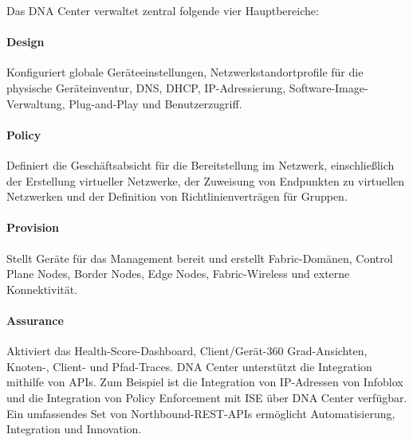 Das DNA Center verwaltet zentral folgende vier Hauptbereiche: \cite{sda-designguide}
\paragraph{Design}
Konfiguriert globale Geräteeinstellungen, Netzwerkstandortprofile für die physische Geräteinventur, DNS, DHCP, IP-Adressierung, Software-Image-Verwaltung, Plug-and-Play und Benutzerzugriff.
\paragraph{Policy}
Definiert die Geschäftsabsicht für die Bereitstellung im Netzwerk, einschließlich der Erstellung virtueller Netzwerke, der Zuweisung von Endpunkten zu virtuellen Netzwerken und der Definition von Richtlinienverträgen für Gruppen.
\paragraph{Provision}
Stellt Geräte für das Management bereit und erstellt Fabric-Domänen, Control Plane Nodes, Border Nodes, Edge Nodes, Fabric-Wireless und externe Konnektivität.

\paragraph{Assurance}
Aktiviert das Health-Score-Dashboard, Client/Gerät-360 Grad-Ansichten, Knoten-, Client- und Pfad-Traces. DNA Center unterstützt die Integration mithilfe von APIs. Zum Beispiel ist die Integration von IP-Adressen von Infoblox und die Integration von Policy Enforcement mit ISE über DNA Center verfügbar. Ein umfassendes Set von Northbound-REST-APIs ermöglicht Automatisierung, Integration und Innovation.



